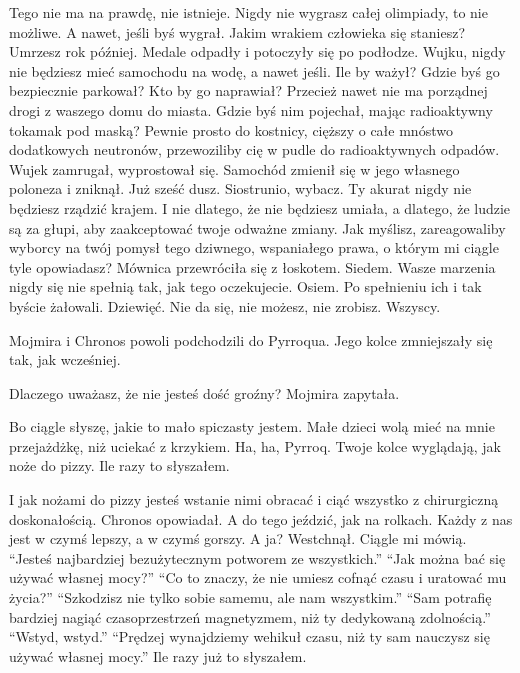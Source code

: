\ds{}
Tego nie ma na prawdę, nie istnieje.
Nigdy nie wygrasz całej olimpiady, to nie możliwe.
A nawet, jeśli byś wygrał. Jakim wrakiem człowieka się staniesz?
Umrzesz rok później.
\dm{} Medale odpadły i potoczyły się po podłodze. \dm{}
Wujku, nigdy nie będziesz mieć samochodu na wodę, a nawet jeśli.
Ile by ważył? Gdzie byś go bezpiecznie parkował? Kto by go naprawiał?
Przecież nawet nie ma porządnej drogi z waszego domu do miasta.
Gdzie byś nim pojechał, mając radioaktywny tokamak pod maską?
Pewnie prosto do kostnicy, cięższy o całe mnóstwo dodatkowych neutronów, przewoziliby cię w pudle do radioaktywnych odpadów.
\dm{} Wujek zamrugał, wyprostował się. Samochód zmienił się w jego własnego poloneza i zniknął. Już sześć dusz. \dm{}
Siostrunio, wybacz. Ty akurat nigdy nie będziesz rządzić krajem. I nie dlatego, że nie będziesz umiała, a dlatego, że ludzie są za głupi, aby zaakceptować 
twoje odważne zmiany. Jak myślisz, zareagowaliby wyborcy na twój pomysł tego dziwnego, wspaniałego prawa, o którym mi ciągle tyle opowiadasz?
\dm{} Mównica przewróciła się z łoskotem. Siedem. \dm{}
Wasze marzenia nigdy się nie spełnią tak, jak tego oczekujecie. \dm{} Osiem. \dm{}
Po spełnieniu ich i tak byście żałowali. \dm{} Dziewięć. \dm{}
Nie da się, nie możesz, nie zrobisz. \dm{} Wszyscy. \dm{}

Mojmira i Chronos powoli podchodzili do Pyrroqua. Jego kolce zmniejszały się tak, jak wcześniej.

\ds{} Dlaczego uważasz, że nie jesteś dość groźny? \dm{} Mojmira zapytała. \de{}

\ds{} Bo ciągle słyszę, jakie to mało spiczasty jestem. Małe dzieci wolą mieć na mnie przejażdżkę, niż uciekać z krzykiem.
Ha, ha, Pyrroq. Twoje kolce wyglądają, jak noże do pizzy. Ile razy to słyszałem. \de{}

\ds{} I jak nożami do pizzy jesteś wstanie nimi obracać i ciąć wszystko z chirurgiczną doskonałością. \dm{} Chronos opowiadał. \dm{} A do tego jeździć, jak na rolkach.
Każdy z nas jest w czymś lepszy, a w czymś gorszy. A ja? \dm{} Westchnął. \dm{} Ciągle mi mówią.  "`Jesteś najbardziej bezużytecznym potworem ze wszystkich."' 
"`Jak można bać się używać własnej mocy?"' "`Co to znaczy, że nie umiesz cofnąć czasu i uratować mu życia?"'
"`Szkodzisz nie tylko sobie samemu, ale nam wszystkim."'
"`Sam potrafię bardziej nagiąć czasoprzestrzeń magnetyzmem, niż ty dedykowaną zdolnością."'
"`Wstyd, wstyd."' "`Prędzej wynajdziemy wehikuł czasu, niż ty sam nauczysz się używać własnej mocy."' Ile razy już to słyszałem. \de{}

